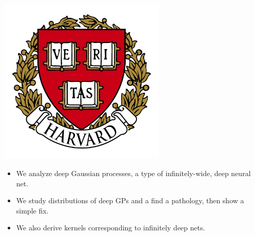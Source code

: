 \documentclass[portrait,a0b,final,a4resizeable]{include/a0poster}
\begin{document}
\begin{poster}
\begin{center}
\begin{pcolumn}{0.99}
{\begin{minipage}[c]{\logowidth}
  \begin{flushright}
    \includegraphics[width=8cm,trim=2em 0em 2em 2em, clip]{badges/harvard}
  \end{flushright}
\end{minipage}
%
}
\end{pcolumn}
\end{center}

\vspace*{0.5cm}

\large




\begin{multicols}{2}

\Large


\begin{itemize}
	\item We analyze deep Gaussian processes, a type of infinitely-wide, deep neural net.
	\item We study distributions of deep GPs and a find a pathology, then show a simple fix.
	\item We also derive kernels corresponding to infinitely deep nets.
\end{itemize}

\vspace{0.5in}





\end{multicols}
\end{poster}
\end{document}
